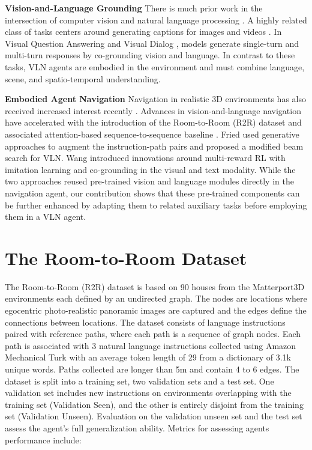 \documentclass[10pt,twocolumn,letterpaper]{article}
\begin{document}
\noindent
\textbf{Vision-and-Language Grounding} There is much prior work in the intersection of computer vision and natural language processing \cite{2015:Xu:ShowAttendTell,Karpathy:2015:VisualAlignmentCaptions,Mao:2016:GenerationComprehensionObjects,Hu:2016:SegmentationNLE}. A highly related class of tasks centers around generating captions for images and videos \cite{Donahue:2017:LTRCNCaption,Fang:2015:VisualCaptions,Vinyals:2015:ShowAndTell,Wang:2018:VideoCV,Yu:2016:VideoParagraphCaptioning}. In Visual Question Answering \cite{Antol:2015:VQA,Yang:2016:StackedANQnA} and Visual Dialog \cite{das:2017:VisualDialog}, models generate single-turn and multi-turn responses by co-grounding vision and language. In contrast to these tasks, VLN agents are embodied in the environment and must combine language, scene, and spatio-temporal understanding.

\noindent
\textbf{Embodied Agent Navigation} Navigation in realistic 3D environments has also received increased interest recently \cite{Toshev:2018:SemanticNavigation,Hemachandra:2015:VLN,Mirowski:2018:StreetLearn,Zhu:2017:IndoorNavigation}. Advances in vision-and-language navigation have accelerated with the introduction of the Room-to-Room (R2R) dataset and associated attention-based sequence-to-sequence baseline \cite{Anderson:2018:VLN}. Fried \etal \cite{Fried:2018:Speaker} used generative approaches to augment the instruction-path pairs and proposed a modified beam search for VLN. Wang \etal \cite{Wang:2018:RCM} introduced innovations around multi-reward RL with imitation learning and co-grounding in the visual and text modality. While the two approaches reused pre-trained vision and language modules directly in the navigation agent, our contribution shows that these pre-trained components can be further enhanced by adapting them to related auxiliary tasks before employing them in a VLN agent. 
\section{The Room-to-Room Dataset}
\label{sec:data}

The Room-to-Room (R2R) dataset \cite{Anderson:2018:VLN} is based on 90 houses from the Matterport3D environments \cite{Matterport3D} each defined by an undirected graph. The nodes are locations where egocentric photo-realistic panoramic images are captured and the edges define the connections between locations. The dataset consists of language instructions paired with reference paths, where each path is a sequence of graph nodes. Each path is associated with 3 natural language instructions collected using Amazon Mechanical Turk with an average token length of 29 from a dictionary of 3.1k unique words. Paths collected are longer than 5m and contain 4 to 6 edges. The dataset is split into a training set, two validation sets and a test set. One validation set includes new instructions on environments overlapping with the training set (Validation Seen), and the other is entirely disjoint from the training set (Validation Unseen). Evaluation on the validation unseen set and the test set assess the agent's full generalization ability. Metrics for assessing agents performance include:
\end{document}
